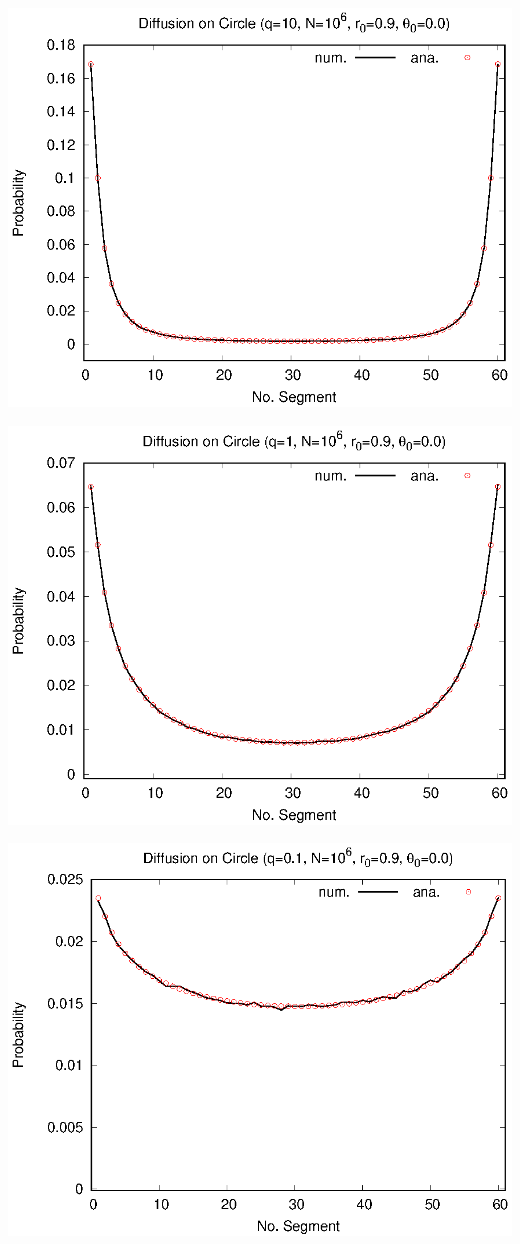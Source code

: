 \documentclass[12pt, oneside]{article}   	%
\begin{document}
\begin{center}
\includegraphics[width=0.9\linewidth]{res/sim-7/pbb_cc.eps}
\end{center}
\begin{center}
\includegraphics[width=0.9\linewidth]{res/sim-8/pbb_cc.eps}
\end{center}
\begin{center}
\includegraphics[width=0.9\linewidth]{res/sim-9/pbb_cc.eps}
\end{center}
\end{document}

